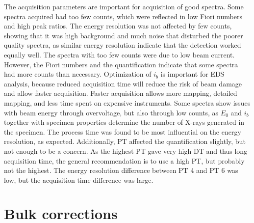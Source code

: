 The acquisition parameters are important for acquisition of good spectra.
Some spectra acquired had too few counts, which were reflected in low Fiori numbers and high peak ratios.
The energy resolution was not affected by few counts, showing that it was high background and much noise that disturbed the poorer quality spectra, as similar energy resolution indicate that the detection worked equally well.
The spectra with too few counts were due to low beam current.
However, the Fiori numbers and the quantification indicate that some spectra had more counts than necessary.
Optimization of $i_b$ is important for EDS analysis, because reduced acquisition time will reduce the risk of beam damage and allow faster acquisition.
Faster acquisition allows more mapping, detailed mapping, and less time spent on expensive instruments.
Some spectra show issues with beam energy through overvoltage, but also through low counts, as  $E_0$ and $i_b$ together with specimen properties determine the number of X-rays generated in the specimen.
The process time was found to be most influential on the energy resolution, as expected.
Additionally, PT affected the quantification slightly, but not enough to be a concern.
As the highest PT gave very high DT and thus long acquisition time, the general recommendation is to use a high PT, but probably not the highest.
The energy resolution difference between PT 4 and PT 6 was low, but the acquisition time difference was large.


\clearpage




























\section{Bulk corrections}
\label{discussion:bulk_corrections}


